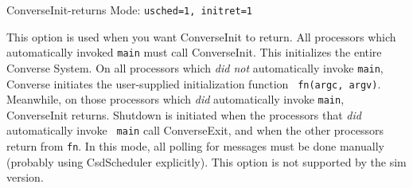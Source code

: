 ConverseInit-returns Mode: {\tt usched=1, initret=1}

This option is used when you want ConverseInit to return.  All
processors which automatically invoked {\tt main} must call
ConverseInit.  This initializes the entire Converse System.  On all
processors which {\em did not} automatically invoke {\tt main},
Converse initiates the user-supplied initialization function {\tt
fn(argc, argv)}.  Meanwhile, on those processors which {\em did}
automatically invoke {\tt main}, ConverseInit returns.  Shutdown is
initiated when the processors that {\em did} automatically invoke {\tt
main} call ConverseExit, and when the other processors return from
{\tt fn}.  In this mode, all polling for messages must be done
manually (probably using CsdScheduler explicitly).  This option is not
supported by the sim version.


